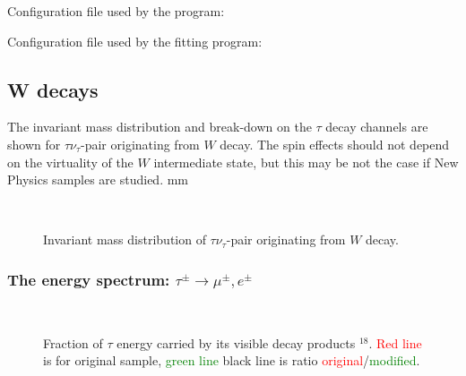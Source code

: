 \noindent
Configuration file used by the program:

\vspace{1\baselineskip}

{\small {} }

\noindent
Configuration file used by the fitting program:

\vspace{1\baselineskip}

{\small {} }

\newpage
\subsection{W decays}\label{Sec:W}
The invariant mass distribution and break-down on the $\tau$ decay channels are shown
for $\tau \nu_\tau$-pair originating from $W$ decay. The spin effects should not depend on the virtuality of the
$W$ intermediate state, but this may be not the case if New Physics samples are studied.
 mm

\begin{figure}[h!]
\centering 
{} \\
\caption{ Invariant mass distribution of $\tau \nu_\tau$-pair originating from $W$ decay.}
\end{figure}

{\small {} }
\newpage

\subsubsection{ The energy spectrum: $\tau^\pm \to \mu^\pm, e^\pm$}
\vspace{1\baselineskip}

\begin{figure}[h!]
\centering 
{}
 \\
\caption{ Fraction of $\tau$ energy carried by its visible  decay products%
$^{18}$. 
\textcolor{red}{Red line} is for original sample,
\textcolor{green}{green line} \greenlineis
black line is ratio \textcolor{red}{original}/\textcolor{green}{modified}.
}
\end{figure}


